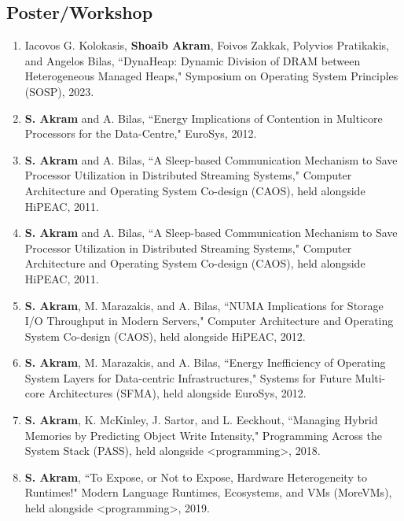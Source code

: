 \documentclass[singlecolumn,singlespace,11pt,a4paper]{article}
\begin{document}
\subsection*{Poster/Workshop}
\begin{enumerate}

\item
Iacovos G. Kolokasis, \textbf{Shoaib Akram}, Foivos Zakkak, Polyvios Pratikakis, and Angelos Bilas, ``DynaHeap: Dynamic Division of DRAM between Heterogeneous Managed Heaps,"
Symposium on Operating System Principles (SOSP), 2023. 

\item
\textbf{S. Akram} and A. Bilas, ``Energy Implications of Contention in Multicore Processors for the Data-Centre,"
EuroSys, 2012.

\item
\textbf{S. Akram} and A. Bilas, ``A Sleep-based Communication Mechanism to Save Processor Utilization in Distributed Streaming Systems,"
Computer Architecture and Operating System Co-design (CAOS), held alongside HiPEAC, 2011.


\item
\textbf{S. Akram} and A. Bilas, ``A Sleep-based Communication Mechanism to Save Processor Utilization in Distributed Streaming Systems,"
Computer Architecture and Operating System Co-design (CAOS), held alongside HiPEAC, 2011.

\item
\textbf{S. Akram}, M. Marazakis, and A. Bilas, ``NUMA Implications for Storage I/O Throughput in Modern Servers," 
Computer Architecture and Operating System Co-design (CAOS), held alongside HiPEAC, 2012. 

\item
\textbf{S. Akram}, M. Marazakis, and A. Bilas, ``Energy Inefficiency of Operating System Layers for Data-centric Infrastructures," Systems for Future Multi-core Architectures (SFMA), held alongside EuroSys, 2012.
\item
\textbf{S. Akram}, K. McKinley, J. Sartor, and L. Eeckhout, ``Managing Hybrid Memories by Predicting Object Write Intensity," Programming Across the System Stack (PASS), held alongside <programming>, 2018.

\item
\textbf{S. Akram}, ``To Expose, or Not to Expose, Hardware Heterogeneity to Runtimes!" Modern Language Runtimes, Ecosystems, and VMs (MoreVMs), held alongside <programming>, 2019.
\end{enumerate}
\end{document}
